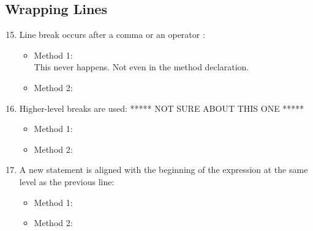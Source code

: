 \subsection{Wrapping Lines}
\begin{enumerate}
	\setcounter{enumi}{14}
	\item Line break occurs after a comma or an operator :
	\begin{itemize}
		\item Method 1: \xmark \\
		This never happens. Not even in the method declaration.
		\item Method 2:
	\end{itemize}
	\item Higher-level breaks are used: ***** NOT SURE ABOUT THIS ONE *****
	\begin{itemize}
		\item Method 1:
		\item Method 2:
	\end{itemize}
	\item A new statement is aligned with the beginning of the expression at the same level as the previous line:
	\begin{itemize}
		\item Method 1: \cmark
		\item Method 2: 
	\end{itemize}
\end{enumerate}